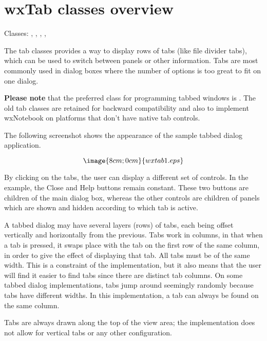 \section{wxTab classes overview}\label{wxtaboverview}

Classes: , ,
 , ,

The tab classes provides a way to display rows of tabs (like file divider tabs), which can be
used to switch between panels or other information. Tabs are most
commonly used in dialog boxes where the number of options is too great
to fit on one dialog.

{\bf Please note} that the preferred class for programming tabbed windows is .
The old tab classes are retained for backward compatibility and also to implement
wxNotebook on platforms that don't have native tab controls.


The following screenshot shows the appearance of the sample tabbed dialog application.

$$\image{8cm;0cm}{wxtab1.eps}$$

By clicking on the tabs, the user can display a different set of controls. In the example,
the Close and Help buttons remain constant. These two buttons are children of the main dialog box,
whereas the other controls are children of panels which are shown and hidden according to
which tab is active.

A tabbed dialog may have several layers (rows) of tabs, each being
offset vertically and horizontally from the previous. Tabs work in
columns, in that when a tab is pressed, it swaps place with the tab on
the first row of the same column, in order to give the effect of
displaying that tab. All tabs must be of the same width.
This is a constraint of the implementation, but it also
means that the user will find it easier to find tabs since there are
distinct tab columns. On some tabbed dialog implementations, tabs jump around
seemingly randomly because tabs have different widths.
In this implementation, a tab can always be found on the same column.

Tabs are always drawn along the top of the view area; the implementation does
not allow for vertical tabs or any other configuration.

